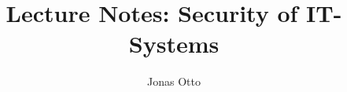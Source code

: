 \documentclass{report}
\title{Lecture Notes: Security of IT-Systems}
\author{Jonas Otto}
\begin{document}
\maketitle

\listoftodos

\tableofcontents












\end{document}
